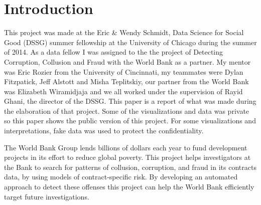 \chapter{Introduction}\label{chap_intro}

This project was made at the Eric \& Wendy Schmidt, Data Science for Social Good (DSSG) summer fellowship at the University of Chicago during the summer of 2014. As a data fellow I was assigned to the the project of Detecting Corruption, Collusion and Fraud with the World Bank as a partner.  My mentor was Eric Rozier from the University of Cincinnati, my teammates were Dylan Fitzpatick, Jeff Alstott and Misha Teplitskiy, our partner from the World Bank was  Elizabeth Wiramidjaja and we all worked under the supervision of Rayid Ghani, the director of the DSSG. This paper is a report of what was made during the elaboration of that project. Some of the visualizations and data was private so this paper shows the public version of this project. For some visualizations and interpretations, fake data was used to protect the confidentiality.

The World Bank Group lends billions of dollars each year to fund development projects in its effort to reduce global poverty. This project helps investigators at the Bank to search for patterns of collusion, corruption, and fraud in its contracts data, by using models of contract-specific risk. By developing an automated approach to detect these offenses this project can help the World Bank efficiently target future investigations.

